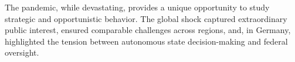 \documentclass[12pt, abstract=true]{scrartcl}
\begin{document}
The pandemic, while devastating, provides a unique opportunity to study strategic and opportunistic behavior. The global shock captured extraordinary public interest, ensured comparable challenges across regions, and, in Germany, highlighted the tension between autonomous state decision-making and federal oversight.
%
%
\end{document}
